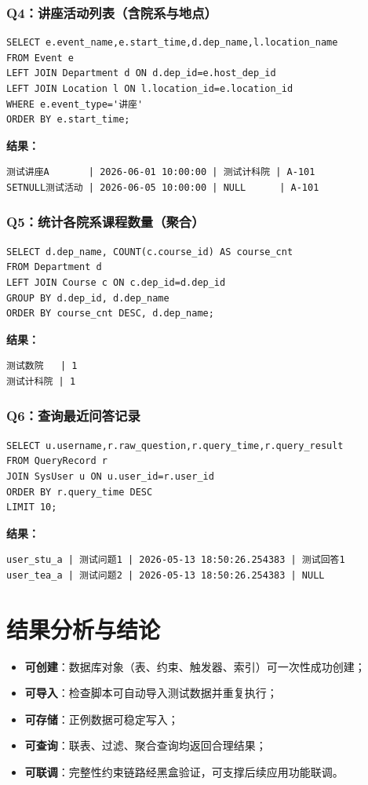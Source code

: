 \documentclass[11pt, a4paper]{article}
\begin{document}
\subsubsection*{Q4：讲座活动列表（含院系与地点）}
\begin{verbatim}
SELECT e.event_name,e.start_time,d.dep_name,l.location_name
FROM Event e
LEFT JOIN Department d ON d.dep_id=e.host_dep_id
LEFT JOIN Location l ON l.location_id=e.location_id
WHERE e.event_type='讲座'
ORDER BY e.start_time;
\end{verbatim}
\textbf{结果：}
\begin{verbatim}
测试讲座A       | 2026-06-01 10:00:00 | 测试计科院 | A-101
SETNULL测试活动 | 2026-06-05 10:00:00 | NULL      | A-101
\end{verbatim}

\subsubsection*{Q5：统计各院系课程数量（聚合）}
\begin{verbatim}
SELECT d.dep_name, COUNT(c.course_id) AS course_cnt
FROM Department d
LEFT JOIN Course c ON c.dep_id=d.dep_id
GROUP BY d.dep_id, d.dep_name
ORDER BY course_cnt DESC, d.dep_name;
\end{verbatim}
\textbf{结果：}
\begin{verbatim}
测试数院   | 1
测试计科院 | 1
\end{verbatim}

\subsubsection*{Q6：查询最近问答记录}
\begin{verbatim}
SELECT u.username,r.raw_question,r.query_time,r.query_result
FROM QueryRecord r
JOIN SysUser u ON u.user_id=r.user_id
ORDER BY r.query_time DESC
LIMIT 10;
\end{verbatim}
\textbf{结果：}
\begin{verbatim}
user_stu_a | 测试问题1 | 2026-05-13 18:50:26.254383 | 测试回答1
user_tea_a | 测试问题2 | 2026-05-13 18:50:26.254383 | NULL
\end{verbatim}

\section{结果分析与结论}

\begin{itemize}
    \item \textbf{可创建}：数据库对象（表、约束、触发器、索引）可一次性成功创建；
    \item \textbf{可导入}：检查脚本可自动导入测试数据并重复执行；
    \item \textbf{可存储}：正例数据可稳定写入；
    \item \textbf{可查询}：联表、过滤、聚合查询均返回合理结果；
    \item \textbf{可联调}：完整性约束链路经黑盒验证，可支撑后续应用功能联调。
\end{itemize}
\end{document}
